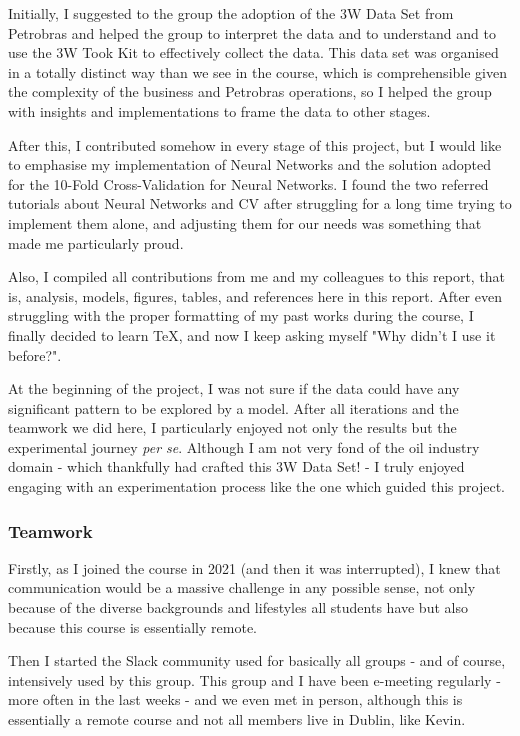 \documentclass{article}
\begin{document}
Initially, I suggested to the group the adoption of the 3W Data Set from Petrobras and helped the group to interpret the data and to understand and to use the 3W Took Kit to effectively collect the data. This data set was organised in a totally distinct way than we see in the course, which is comprehensible given the complexity of the business and Petrobras operations, so I helped the group with insights and implementations to frame the data to other stages.

After this, I contributed somehow in every stage of this project, but I would like to emphasise my implementation of Neural Networks and the solution adopted for the 10-Fold Cross-Validation for Neural Networks. I found the two referred tutorials about Neural Networks and CV after struggling for a long time trying to implement them alone, and adjusting them for our needs was something that made me particularly proud.

Also, I compiled all contributions from me and my colleagues to this report, that is, analysis, models, figures, tables, and references here in this report. After even struggling with the proper formatting of my past works during the course, I finally decided to learn TeX, and now I keep asking myself "Why didn't I use it before?".

At the beginning of the project, I was not sure if the data could have any significant pattern to be explored by a model. After all iterations and the teamwork we did here, I particularly enjoyed not only the results but the experimental journey \emph{per se}. Although I am not very fond of the oil industry domain - which thankfully had crafted this 3W Data Set! - I truly enjoyed engaging with an experimentation process like the one which guided this project. 

\subsubsection{Teamwork}
Firstly, as I joined the course in 2021 (and then it was interrupted), I knew that communication would be a massive challenge in any possible sense, not only because of the diverse backgrounds and lifestyles all students have but also because this course is essentially remote. 

Then I started the Slack community used for basically all groups - and of course, intensively used by this group. This group and I have been e-meeting regularly - more often in the last weeks - and we even met in person, although this is essentially a remote course and not all members live in Dublin, like Kevin. 
\end{document}
